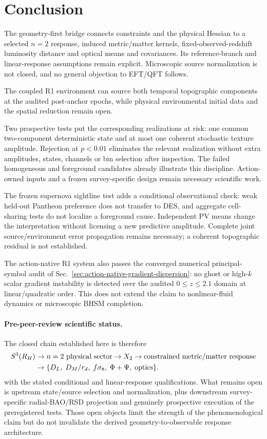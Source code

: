 \section{Conclusion}
\label{sec:geometry-first-conclusion}
The geometry-first bridge connects constraints and the physical Hessian to
a selected $n=2$ response, induced metric/matter kernels, fixed-observed-redshift
luminosity distance and optical means and covariances. Its reference-branch
and linear-response assumptions remain explicit. Microscopic source
normalization is not closed, and no general objection to EFT/QFT follows.

The coupled R1 environment can source both temporal topographic components
at the audited post-anchor epochs, while physical environmental initial data
and the spatial reduction remain open.

Two prospective tests put the corresponding realizations at risk:
one common two-component deterministic state and at most one coherent
stochastic texture amplitude. Rejection at $p<0.01$ eliminates the relevant
realization without extra amplitudes, states, channels or bin selection
after inspection. The failed homogeneous and foreground candidates already
illustrate this discipline. Action-owned inputs and a frozen survey-specific
design remain necessary scientific work.

The frozen supernova sightline test adds a conditional observational check:
weak held-out Pantheon preference does not transfer to DES, and aggregate
cell-sharing tests do not localize a foreground cause. Independent PV means
change the interpretation without licensing a new predictive amplitude.
Complete joint source/environment error propagation remains necessary;
a coherent topographic residual is not established.

The action-native R1 system also passes the converged numerical principal-symbol audit of Sec.~\ref{sec:action-native-gradient-dispersion}: no ghost or high-$k$ scalar gradient instability is detected over the audited $0\le z\le2.1$ domain at linear/quadratic order. This does not extend the claim to nonlinear-fluid dynamics or microscopic BHSM completion.

\paragraph{Pre-peer-review scientific status.}
The closed chain established here is therefore
\[
\begin{aligned}
S^3(R_H)
&\rightarrow n=2\ {\rm physical\ sector}
\rightarrow X_2
\rightarrow {\rm constrained\ metric/matter\ response}\\
&\rightarrow
\{D_L,\;D_M/r_d,\;f\sigma_8,\;\Phi+\Psi,\;\mathrm{optics}\}.
\end{aligned}
\]
with the stated conditional and linear-response qualifications.
What remains open is upstream state/source selection and normalization, plus
downstream survey-specific radial-BAO/RSD projection and genuinely
prospective execution of the preregistered tests.  Those open objects limit
the strength of the phenomenological claim but do not invalidate the derived
geometry-to-observable response architecture.
